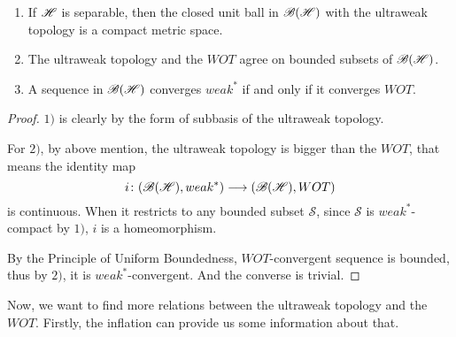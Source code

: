 \documentclass[a4paper,11pt]{report}
\begin{document}
\begin{prop}
	\begin{enumerate}[label = \arabic*)]
		\item If $\mathscr{H}$ is separable, then the closed unit ball in $\mathscr{B(H)}$ with the ultraweak topology is a compact metric space.
		\item The ultraweak topology and the $WOT$ agree on bounded subsets of $\mathscr{B(H)}$.
		\item A sequence in $\mathscr{B(H)}$ converges $weak^{*}$ if and only if it converges $WOT$.
	\end{enumerate}
\end{prop}
\begin{proof}
	$1)$ is clearly by the form of subbasis of the ultraweak topology. 
	\item For $2)$, by above mention, the ultraweak topology is bigger than the $WOT$, that means the identity map
	\begin{equation*}
		i \colon (\mathscr{B(H)}, weak^{*}) \longrightarrow (\mathscr{B(H)}, WOT)
	\end{equation*}
	is continuous. When it restricts to any bounded subset $\mathcal{S}$, since $\mathcal{S}$ is $weak^{*}$-compact by $1)$, $i$ is a homeomorphism.
	\item By the Principle of Uniform Boundedness, $WOT$-convergent sequence is bounded, thus by $2)$, it is $weak^{*}$-convergent. And the converse is trivial.
\end{proof}

Now, we want to find more relations between the ultraweak topology and the $WOT$. Firstly, the inflation can provide us some information about that.
\end{document}
